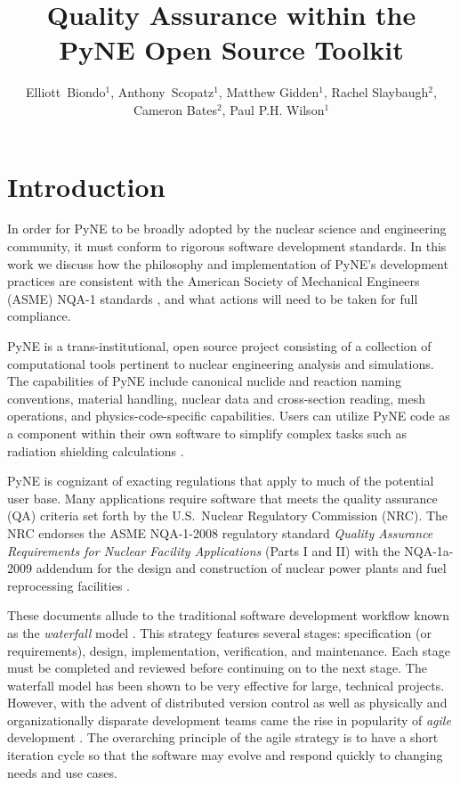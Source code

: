 \documentclass{anstrans}
\title{Quality Assurance within the PyNE Open Source Toolkit}
\author{Elliott~Biondo$^{1}$, Anthony~Scopatz$^{1}$, Matthew Gidden$^{1}$, Rachel Slaybaugh$^{2}$, Cameron Bates$^{2}$, Paul P.H. Wilson$^{1}$}
\institute{
\and $^{1}$ The University of Wisconsin-Madison, 1500 Engineering Drive, Madison, WI 53706\\
\and $^{2}$ The University of California, Berkeley, 2521 Hearst Ave, Berkeley, CA 94709 \\
}
\begin{document}
\section{Introduction}

In order for PyNE \cite{scopatz_pyne} to be broadly adopted by the nuclear
science and engineering community, it must conform to rigorous
software development standards. In this work we discuss how the
philosophy and implementation of PyNE's development practices are consistent
with the American Society of Mechanical Engineers (ASME) NQA-1 standards
\cite{nqa}\cite{add}, and what actions will need to be taken for full
compliance.

PyNE is a trans-institutional, open source project consisting of a collection
of computational tools pertinent to nuclear engineering analysis and
simulations. The capabilities of PyNE include canonical nuclide and reaction
naming conventions, material handling, nuclear data and cross-section reading,
mesh operations, and physics-code-specific capabilities. 
Users can utilize PyNE code as a component within their own software to simplify complex tasks
such as radiation shielding calculations \cite{Biondo2014}.

PyNE is cognizant of
exacting regulations that apply to much of the potential user base.  Many
applications require software that meets the quality assurance (QA) criteria
set forth by the U.S.\ Nuclear Regulatory Commission (NRC). The NRC endorses
the ASME NQA-1-2008 regulatory standard \emph{Quality Assurance Requirements
for Nuclear Facility Applications} (Parts I and II) \cite{nrc} with the
NQA-1a-2009 addendum \cite{add} for the design and construction of nuclear
power plants and fuel reprocessing facilities \cite{nrc}.

These documents allude to the traditional software development workflow known as the 
\emph{waterfall} model \cite{waterfall}. This strategy features several stages:
specification (or requirements), design, implementation, verification, and maintenance. 
Each stage must be 
completed and reviewed before continuing on to the next stage. The waterfall 
model has been shown to be very effective for large, technical projects.
However, with the advent of distributed version control as well as physically 
and organizationally disparate development teams came the rise in popularity
of \emph{agile} development \cite{larman2004agile}. The overarching principle 
of the agile strategy is to have a short iteration cycle so that the software
may evolve and respond quickly to changing needs and use cases.
\end{document}
